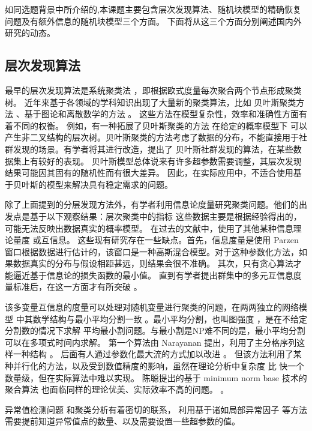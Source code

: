 如同选题背景中所介绍的,本课题主要包含层次发现算法、随机块模型的精确恢复问题及有额外信息的随机块模型三个方面。
下面将从这三个方面分别阐述国内外研究的动态。
\subsection{层次发现算法}

最早的层次发现算法是系统聚类法 \cite{slink}，即根据欧式度量每次聚合两个节点形成聚类树。
近年来基于各领域的学科知识出现了大量新的聚类算法，比如
贝叶斯聚类方法 \cite{bhc}、基于图论和离散数学的方法 \cite{dasgupta2016cost}
。
这些方法在模型复杂性，效率和准确性方面有着不同的权衡。
例如，有一种拓展了贝叶斯聚类的方法 \cite{blundell2011discovering}
在给定的概率模型下
可以产生非二叉结构的层次树。贝叶斯聚类的方法考虑了数据的分布，不能直接用于社群发现的场景。有学者将其进行改造，提出了
贝叶斯社群发现的算法\cite{RN23}，在某些数据集上有较好的表现。
贝叶斯模型总体说来有许多超参数需要调整，其层次发现结果可能因其固有的随机性而有很大差异。 因此，在实际应用中，不适合使用基于贝叶斯的模型来解决具有稳定需求的问题。 

除了上面提到的分层发现方法外，有学者利用信息论度量研究聚类问题。他们的出发点是基于以下观察结果：层次聚类中的指标
这些数据主要是根据经验得出的，可能无法反映出数据真实的概率模型。
在过去的文献中，使用了其他某种信息理论量度 \cite{ic2002} 或互信息\cite{mim}。
这些现有研究存在一些缺点。首先，信息度量是使用 Parzen 窗口根据数据进行估计的，该窗口是一种高斯混合模型。对于这种参数化方法，如果数据真实的分布与假设相距甚远，则结果会很不准确。
其次，只有贪心算法才能逼近基于信息论的损失函数的最小值。 
直到有学者提出群集中的多元互信息度量标准后，在这一方面才有所突破 \cite{ic2016}。 

该多变量互信息的度量可以处理对随机变量进行聚类的问题，在两两独立的网络模型 \cite{pin}
中其数学结构与最小平均分割一致  \cite{mac}。最小平均分割，也叫图强度 \cite{cunningham1985optimal}，是在不给定分割数的情况下求解
平均最小割问题。与最小割是NP难不同的是，最小平均分割可以在多项式时间内求解。
第一个算法由 Narayanan 提出，利用了主分格序列这样一种结构 \cite{narayanan}。
后面有人通过参数化最大流的方式加以改进 \cite{pic}。
但该方法利用了某种并行化的方法，以及受到数值精度的影响，虽然在理论分析中复杂度
比 \cite{narayanan} 快一个数量级，但在实际算法中难以实现。
陈聪提出的基于 minimum norm base 技术的聚合算法 也面临同样的理论优美、实际效率不高的问题。 \cite{chan2020agglomerative}。

异常值检测问题 \cite{grubbs1969procedures} 和聚类分析有着密切的联系，
利用基于诸如局部异常因子 \cite{Breunig} 等方法需要提前知道异常值点的数量、以及需要设置一些超参数的值。

